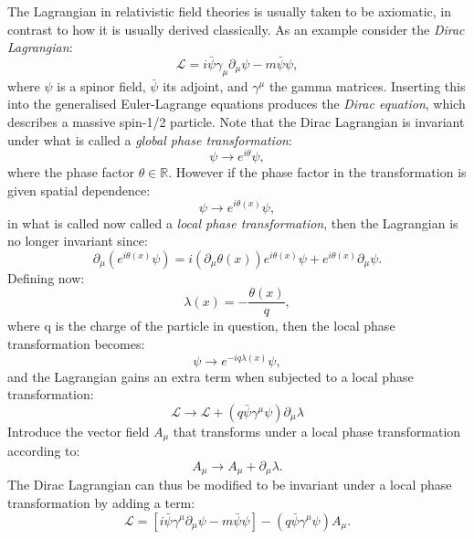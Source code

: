 The Lagrangian in relativistic field theories is usually taken to be axiomatic, in contrast to how it is usually derived classically. As an example consider the \emph{Dirac Lagrangian}:
\begin{equation}
\mathcal{L} = i \bar{\psi} \gamma _{\mu} \partial_{\mu} \psi - m \bar{\psi} \psi,
\end{equation}
where $\psi$ is a spinor field, $\bar{\psi}$ its adjoint, and $\gamma ^{\mu}$ the gamma matrices. Inserting this into the generalised Euler-Lagrange equations produces the \emph{Dirac equation}, which describes a massive spin-1/2 particle. Note that the Dirac Lagrangian is invariant under what is called a \emph{global phase transformation}: 
\begin{equation}
\psi \longrightarrow e^{i \theta} \psi,
\label{gpt}
\end{equation}
where the phase factor $\theta \in \mathbb{R}$. However if the phase factor in the transformation is given spatial dependence:
\begin{equation}
 \psi \longrightarrow e^{i \theta (x)} \psi,
\end{equation} 
in what is called now called a \emph{local phase transformation}, then the Lagrangian is no longer invariant since:
$$
\partial_{\mu} \left( e^{i \theta (x)} \psi \right) = i \left( \partial_{\mu} \theta(x) \right) e^{i \theta(x)} \psi + e^{i \theta (x)}\partial_{\mu} \psi.
$$
Defining now: 
\begin{equation}
\lambda (x) = - \frac{\theta(x)}{q},
\end{equation}
where q is the charge of the particle in question, then the local phase transformation becomes:
\begin{equation}
\psi \longrightarrow e^{-iq\lambda (x)}\psi,
\end{equation}
and the Lagrangian gains an extra term when subjected to a local phase transformation:
\begin{equation}
\mathcal{L} \longrightarrow \mathcal{L} + \left( q \bar{\psi}\gamma^{\mu} \psi \right) \partial_{\mu}\lambda
\end{equation}
Introduce the vector field $A_{\mu}$ that transforms under a local phase transformation according to:
\begin{equation}
A_{\mu} \longrightarrow A_{\mu} + \partial_{\mu} \lambda.
\label{vf lpt}
\end{equation}
The Dirac Lagrangian can thus be modified to be invariant under a local phase transformation by adding a term:
\begin{equation}
\mathcal{L} = \left[ i \bar{\psi} \gamma^{\mu} \partial_{\mu} \psi - m \bar{\psi} \psi \right] - \left( q \bar{\psi} \gamma^{\mu} \psi \right) A_{\mu}.
\end{equation}
